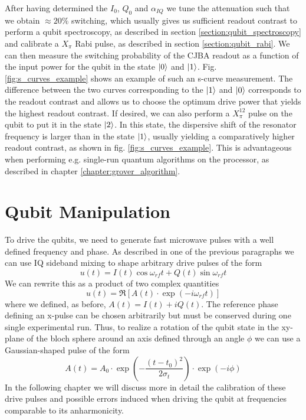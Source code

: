 \smallskip

After having determined the $I_0$, $Q_0$ and $\alpha_{IQ}$ we tune the attenuation such that we obtain $\approx 20\%$ switching, which usually gives us sufficient readout contrast to perform a qubit spectroscopy, as described in section \ref{section:qubit_spectroscopy} and calibrate a $X_\pi$ Rabi pulse, as described in section \ref{section:qubit_rabi}. We can then measure the switching probability of the CJBA readout as a function of the input power for the qubit in the state $\left| 0 \right>$ and $\left| 1 \right>$. Fig. \ref{fig:s_curves_example} shows an example of such an s-curve measurement. The difference between the two curves corresponding to the $\left| 1 \right>$ and $\left| 0 \right>$ corresponds to the readout contrast and allows us to choose the optimum drive power that yields the highest readout contrast. If desired, we can also perform a $X_\pi^{12}$ pulse on the qubit to put it in the state $\left| 2 \right>$. In this state, the dispersive shift of the resonator frequency is larger than in the state $\left| 1 \right>$, usually yielding a comparatively higher readout contrast, as shown in fig. \ref{fig:s_curves_example}. This is advantageous when performing e.g. single-run quantum algorithms on the processor, as described in chapter \ref{chapter:grover_algorithm}.

\section{Qubit Manipulation}

To drive the qubits, we need to generate fast microwave pulses with a well defined frequency and phase. As described in one of the previous paragraphs we can use IQ sideband mixing to shape arbitrary drive pulses of the form
%
\begin{equation}
u(t) = I(t)\cos{\omega_{rf}t}+Q(t)\sin{\omega_{rf}t}
\end{equation}
%
We can rewrite this as a product of two complex quantities
%
\begin{equation}
u(t) = \Re\left[ A(t)\cdot\exp{\left(-i\omega_{rf} t\right)}\right]
\end{equation}
%
where we defined, as before, $A(t)=I(t)+iQ(t)$. The reference phase defining an x-pulse can be chosen arbitrarily but must be conserved during one single experimental run. Thus, to realize a rotation of the qubit state in the xy-plane of the bloch sphere around an axis defined through an angle $\phi$ we can use a Gaussian-shaped pulse of the form
%
\begin{equation}
A(t) = A_0\cdot\exp{\left(-\frac{(t-t_0)^2}{2\sigma_t}\right)}\cdot\exp{\left(-i\phi\right)}
\end{equation}
%
In the following chapter we will discuss more in detail the calibration of these drive pulses and possible errors induced when driving the qubit at frequencies comparable to its anharmonicity. 

